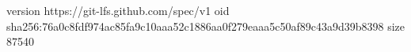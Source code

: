 version https://git-lfs.github.com/spec/v1
oid sha256:76a0c8fdf974ac85fa9c10aaa52c1886aa0f279eaaa5c50af89c43a9d39b8398
size 87540
